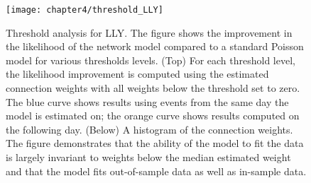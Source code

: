 
			\begin{figure}[p]
				\small
				\linespread{1}
				\centering
				\captionsetup{labelsep=colon, font=footnotesize, justification=centerfirst, width=\linewidth}
				\texttt{[image: chapter4/threshold\_LLY]}
				\captionsetup{skip=-20pt, position=below, font=footnotesize, justification=justified, width=\linewidth}
				\caption[Threshold analysis for LLY]{Threshold analysis for LLY. The figure shows the improvement in the likelihood of the network model compared to a standard Poisson model for various thresholds levels. (Top) For each threshold level, the likelihood improvement is computed using the estimated connection weights with all weights below the threshold set to zero. The blue curve shows results using events from the same day the model is estimated on; the orange curve shows results computed on the following day. (Below) A histogram of the connection weights. The figure demonstrates that the ability of the model to fit the data is largely invariant to weights below the median estimated weight and that the model fits out-of-sample data as well as in-sample data.}
				\label{fig:threshold_LLY}
			\end{figure}

